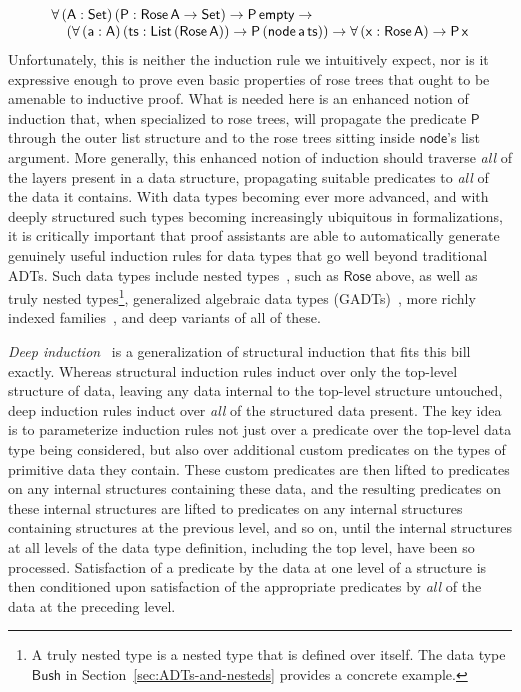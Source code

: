\documentclass[9pt]{entcs}
\begin{document}
\[\begin{array}{l}
\mathsf{\forall\, (A : Set)\,(P : Rose\,A \to Set) \to P\,empty \to}\\
\mathsf{\hspace*{0.15in}
 (\forall\, (a : A)\,(ts :
  List\,(Rose\,A)) \to P\,(node\,a\,ts)) \to 
  \forall \,(x : Rose\,A) \to P\,x}
\end{array}\]
\noindent
Unfortunately, this is neither the induction rule we intuitively
expect, nor is it expressive enough to prove even basic properties of
rose trees that ought to be amenable to inductive proof. What is
needed here is an enhanced notion of induction that, when specialized
to rose trees, will propagate the predicate $\mathsf{P}$ through the
outer list structure and to the rose trees sitting inside
$\mathsf{node}$'s list argument. More generally, this enhanced notion
of induction should traverse {\em all} of the layers present in a data
structure, propagating suitable predicates to {\em all} of the data it
contains. With data types becoming ever more advanced, and with deeply
structured such types becoming increasingly ubiquitous in
formalizations, it is critically important that proof assistants
are able to automatically generate genuinely useful induction rules
for data types that go well beyond traditional ADTs. Such data types
include nested types~\cite{bm98}, such as $\mathsf{Rose}$ above, as
well as truly nested types\footnote{A truly nested type is a nested
  type that is defined over itself. The data type $\mathsf{Bush}$ in
  Section~\ref{sec:ADTs-and-nesteds} provides a concrete example.},
generalized algebraic data types
(GADTs)~\cite{ch03,pvww06,sp04,xcc03}, more richly indexed
families~\cite{ch88}, and deep variants of all of these.

\pagebreak

{\em Deep induction}~\cite{jp20} is a generalization of structural
induction that fits this bill exactly. Whereas structural induction
rules induct over only the top-level structure of data, leaving any
data internal to the top-level structure untouched, deep induction
rules induct over {\em all} of the structured data present. The key
idea is to parameterize induction rules not just over a predicate over
the top-level data type being considered, but also over additional
custom predicates on the types of primitive data they contain. These
custom predicates are then lifted to predicates on any internal
structures containing these data, and the resulting predicates on
these internal structures are lifted to predicates on any internal
structures containing structures at the previous level, and so on,
until the internal structures at all levels of the data type
definition, including the top level, have been so
processed. Satisfaction of a predicate by the data at one level of a
structure is then conditioned upon satisfaction of the appropriate
predicates by {\em all} of the data at the preceding level.
\end{document}
